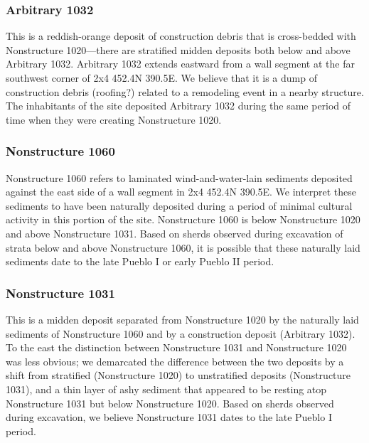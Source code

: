 \documentclass[
  12pt,
]{krantz}
\begin{document}
\hypertarget{arbitrary-1032}{%
\subsubsection{Arbitrary 1032}\label{arbitrary-1032}}

This is a reddish-orange deposit of construction debris that is
cross-bedded with Nonstructure 1020---there are stratified midden
deposits both below and above Arbitrary 1032. Arbitrary 1032 extends
eastward from a wall segment at the far southwest corner of 2x4 452.4N
390.5E. We believe that it is a dump of construction debris (roofing?)
related to a remodeling event in a nearby structure. The inhabitants of
the site deposited Arbitrary 1032 during the same period of time when
they were creating Nonstructure 1020.

\hypertarget{nonstructure-1060}{%
\subsubsection{Nonstructure 1060}\label{nonstructure-1060}}

Nonstructure 1060 refers to laminated wind-and-water-lain sediments
deposited against the east side of a wall segment in 2x4 452.4N 390.5E.
We interpret these sediments to have been naturally deposited during a
period of minimal cultural activity in this portion of the site.
Nonstructure 1060 is below Nonstructure 1020 and above Nonstructure
1031. Based on sherds observed during excavation of strata below and
above Nonstructure 1060, it is possible that these naturally laid
sediments date to the late Pueblo I or early Pueblo II period.

\hypertarget{nonstructure-1031}{%
\subsubsection{Nonstructure 1031}\label{nonstructure-1031}}

This is a midden deposit separated from Nonstructure 1020 by the
naturally laid sediments of Nonstructure 1060 and by a construction
deposit (Arbitrary 1032). To the east the distinction between
Nonstructure 1031 and Nonstructure 1020 was less obvious; we demarcated
the difference between the two deposits by a shift from stratified
(Nonstructure 1020) to unstratified deposits (Nonstructure 1031), and a
thin layer of ashy sediment that appeared to be resting atop
Nonstructure 1031 but below Nonstructure 1020. Based on sherds observed
during excavation, we believe Nonstructure 1031 dates to the late Pueblo
I period.
\end{document}

